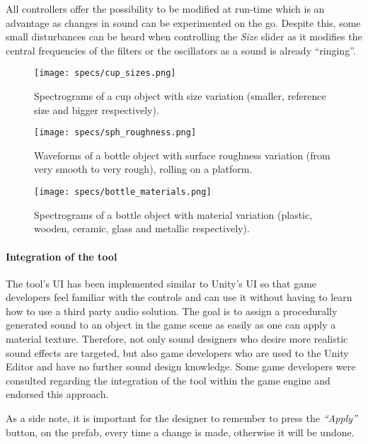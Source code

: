 All controllers offer the possibility to be modified at run-time which is an advantage as changes in sound can be experimented on the go. Despite this, some small disturbances can be heard when controlling the \textit{Size} slider as it modifies the central frequencies of the filters or the oscillators as a sound is already ``ringing''.

\begin{figure}[H]
  \centering
    \texttt{[image: specs/cup\_sizes.png]}
      \caption{Spectrograms of a cup object with size variation (smaller, reference size and bigger respectively).}
      \label{fig:cup_sizes}
\end{figure}

\begin{figure}[H]
  \centering
    \texttt{[image: specs/sph\_roughness.png]}
      \caption{Waveforms of a bottle object with surface roughness variation (from very smooth to very rough), rolling on a platform.}
      \label{fig:bottle_rough}
\end{figure}

\begin{figure}[H]
  \centering
    \texttt{[image: specs/bottle\_materials.png]}
      \caption{Spectrograms of a bottle object with material variation (plastic, wooden, ceramic, glass and metallic respectively).}
      \label{fig:bottle_materials}
\end{figure}

\paragraph{Integration of the tool\\}

The tool's \gls{UI} has been implemented similar to Unity\textsuperscript{\textregistered}'s \gls{UI} so that game developers feel familiar with the controls and can use it without having to learn how to use a third party audio solution. The goal is to assign a procedurally generated sound to an object in the game scene as easily  as one can apply a material texture. Therefore, not only sound designers who desire more realistic sound effects are targeted, but also game developers who are used to the Unity\textsuperscript{\textregistered} Editor and have no further sound design knowledge. Some game developers were consulted regarding the integration of the tool within the game engine and endorsed this approach.

As a side note, it is important for the designer to remember to press the \textit{``Apply''} button, on the prefab, every time a change is made, otherwise it will be undone. 



